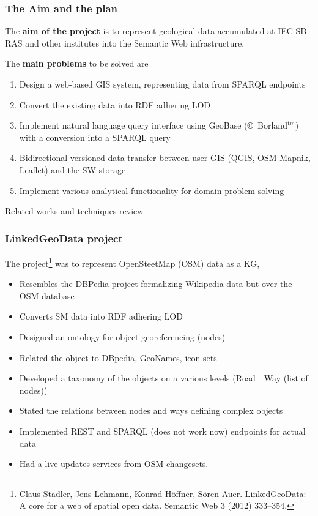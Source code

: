 \documentclass[10pt]{beamer}
\begin{document}
\begin{frame}
  \frametitle{The Aim and the plan}
  The \textbf{aim of the project} is to represent geological data accumulated at IEC SB RAS and other institutes into the Semantic Web infrastructure.

  The \textbf{main problems} to be solved are
  \begin{enumerate}
  \item Design a web-based GIS system, representing data from SPARQL endpoints
  \item Convert the existing data into RDF adhering LOD
  \item Implement natural language query interface using GeoBase (\copyright~Borland${}^{\text{tm}}$) with a conversion into a SPARQL query
  \item Bidirectional versioned data transfer between user GIS (QGIS, OSM Mapnik, Leaflet) and the SW storage %
  \item Implement various analytical functionality for domain problem solving
  \end{enumerate}
\end{frame}


\begin{frame}
  \centering
  \Large Related works and techniques review
\end{frame}


\begin{frame}
  \frametitle{\textbf{LinkedGeoData} project}
  The project\footnote{Claus Stadler, Jens Lehmann, Konrad Höffner, Sören Auer. LinkedGeoData:
A core for a web of spatial open data. Semantic Web 3 (2012) 333–354. } was to represent OpenSteetMap (OSM) data as a KG,
  \begin{itemize}
  \item Resembles the DBPedia project formalizing Wikipedia data but over the OSM database
  \item Converts SM data into RDF adhering LOD
  \item Designed an ontology for object georeferencing (nodes)
  \item Related the object to DBpedia, GeoNames, icon sets
  \item Developed a taxonomy of the objects on a various levels (Road~\to~Way (list of nodes)) %
  \item Stated the relations between nodes and ways defining complex objects
  \item Implemented REST and SPARQL (does not work now) endpoints for actual data
  \item Had a live updates services from OSM changesets.
  \end{itemize}
\end{frame}
\end{document}
